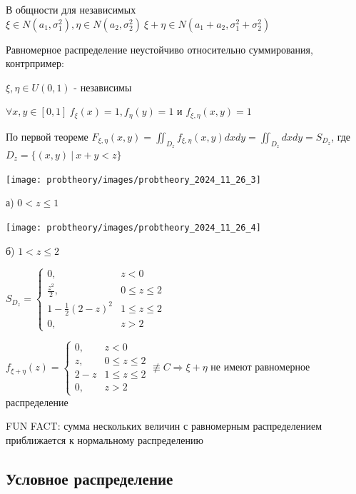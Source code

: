 \documentclass[12pt]{article}
\begin{document}
     В общности для независимых $\xi \in N(a_1, \sigma^2_1), \eta \in N(a_2, \sigma_2^2) \ \xi + \eta \in N(a_1 + a_2, \sigma_1^2 + \sigma_2^2)$ 

     Равномерное распределение неустойчиво относительно суммирования, контрпример:

    $\xi, \eta \in U(0, 1)$ - независимы

    $\forall x, y \in [0, 1] \ f_{\xi}(x) = 1, f_\eta(y) = 1$ и $f_{\xi, \eta}(x, y) = 1$

    По первой теореме $F_{\xi, \eta}(x, y) = \iint_{D_z} f_{\xi, \eta}(x, y) dxdy = \iint_{D_z} dxdy = S_{D_z}$, где $D_z = \{(x, y) \ | \ x + y < z\}$

    \mediumvspace

    \begin{multicols}{2}
        \begin{center}
            \texttt{[image: probtheory/images/probtheory\_2024\_11\_26\_3]}

            а) $0 < z \leq 1$
        \end{center}

        \begin{center}
            \texttt{[image: probtheory/images/probtheory\_2024\_11\_26\_4]}

            б) $1 < z \leq 2$
        \end{center}
    \end{multicols}

    \smallvspace

    $S_{D_z} = \begin{cases}0, & z < 0 \\ \frac{z^2}{2}, & 0 \leq z \leq 2 \\ 1 - \frac{1}{2}(2 - z)^2 & 1 \leq z \leq 2 \\ 0, & z > 2\end{cases}$

    $f_{\xi + \eta}(z) = \begin{cases}0, & z < 0 \\ z, & 0 \leq z \leq 2 \\ 2 - z & 1 \leq z \leq 2 \\ 0, & z > 2\end{cases} \not\equiv C \Longrightarrow \xi + \eta$ не имеют равномерное распределение

    \Nota FUN FACT: сумма нескольких величин с равномерным распределением приближается к нормальному распределению

    \subsection{Условное распределение}
\end{document}
